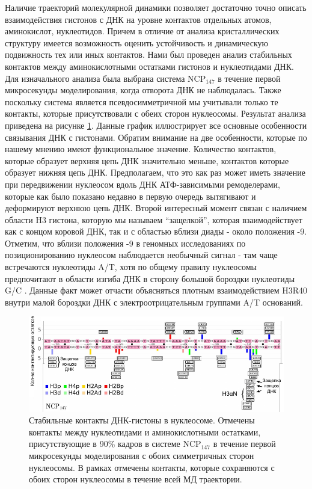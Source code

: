 Наличие траекторий молекулярной динамики позволяет достаточно точно описать взаимодействия гистонов с ДНК на уровне контактов отдельных атомов, аминокислот, нуклеотидов. Причем в отличие от анализа кристаллических структуру имеется возможность оценить устойчивость и динамическую подвижность тех или иных контактов. Нами был проведен анализ стабильных контактов между аминокислотными остатками гистонов и нуклеотидами ДНК. Для изначального анализа была выбрана система NCP$_{147}$ в течение первой микросекунды моделирования, когда отворота ДНК не наблюдалась. Также поскольку система является псевдосимметричной мы учитывали только те контакты, которые присутствовали с обеих сторон нуклеосомы. Результат анализа приведена на рисунке \ref{fig:p2_3:f6}. Данные график иллюстрирует все основные особенности связывания ДНК с гистонами. Обратим внимание на две особенности, которые по нашему мнению имеют функциональное значение. Количество контактов, которые образует верхняя цепь ДНК значительно меньше, контактов которые образует нижняя цепь ДНК. Предполагаем, что это как раз может иметь значение при передвижении нуклеосом вдоль ДНК АТФ-зависимыми ремоделерами, которые как было показано недавно в первую очередь вытягивают и деформируют верхнюю цепь ДНК. Второй интересный момент связан с наличием области H3 гистона, которую мы называем ``защелкой'', которая взаимодействует как с концом коровой ДНК, так и с областью вблизи диады - около положения -9. Отметим, что вблизи положения -9 в геномных исследованиях по позиционированию нуклеосом наблюдается необычный сигнал - там чаще встречаются нуклеотиды A/T, хотя по общему правилу нуклеосомы предпочитают в области изгиба ДНК в сторону большой бороздки нуклеотиды G/C \cite{davey_does_2013}. Данные факт может отчасти объясняться плотным взаимодействием H3R40 внутри малой бороздки ДНК с электроотрицательным группами A/T оснований.


\begin{figure} [H]
    \centering
    \includegraphics[width=\textwidth]{images/p2/10ms/fig6.pdf}
    \caption[Стабильные контакты ДНК-гистоны в нуклеосоме]{Стабильные контакты ДНК-гистоны в нуклеосоме. Отмечены контакты между нуклеотидами и аминокислотными остатками, присутствующие в 90\% кадров в системе NCP$_{147}$ в течение первой микросекунды моделирования с обоих симметричных сторон нуклеосомы. В рамках отмечены контакты, которые сохраняются с обоих сторон нуклеосомы в течение всей МД траектории.}
    \label{fig:p2_3:f6}
\end{figure}

